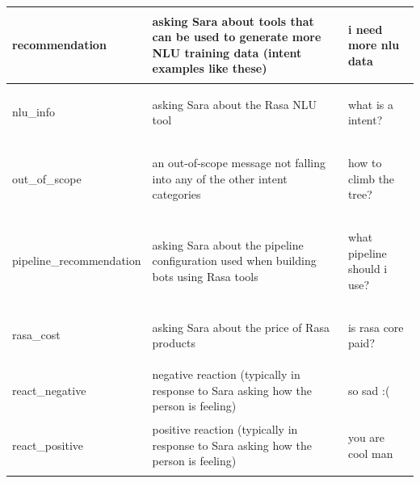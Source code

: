 \documentclass[bsc,frontabs,twoside,singlespacing,parskip,deptreport]{infthesis}
\begin{document}
{\begin{center}
\begin{longtable}{p{}|p{}|p{}}
\begin{spverbatim}
    recommendation\end{spverbatim} & asking Sara about tools that can be used to generate more NLU training data (intent examples like these) & \begin{spverbatim}i need more nlu data\end{spverbatim} \\
    \hline
    \begin{spverbatim}nlu_info\end{spverbatim} & asking Sara about the Rasa NLU tool & \begin{spverbatim}what is a intent?\end{spverbatim} \\
    \hline
    \begin{spverbatim}out_of_scope\end{spverbatim} & an out-of-scope message not falling into any of the other intent categories & \begin{spverbatim}how to climb the tree?\end{spverbatim} \\
    \hline
    \begin{spverbatim}pipeline_recommendation\end{spverbatim} & asking Sara about the pipeline configuration used when building bots using Rasa tools & \begin{spverbatim}what pipeline should i use?\end{spverbatim} \\
    \hline
    \begin{spverbatim}rasa_cost\end{spverbatim} & asking Sara about the price of Rasa products & \begin{spverbatim}is rasa core paid?\end{spverbatim} \\
    \hline
    \begin{spverbatim}react_negative\end{spverbatim} & negative reaction (typically in response to Sara asking how the person is feeling) & \begin{spverbatim}so sad :(\end{spverbatim} \\
    \hline
    \begin{spverbatim}react_positive\end{spverbatim} & positive reaction (typically in response to Sara asking how the person is feeling) & \begin{spverbatim}you are cool man\end{spverbatim} \\

\end{longtable}
\end{center}}
\end{document}
